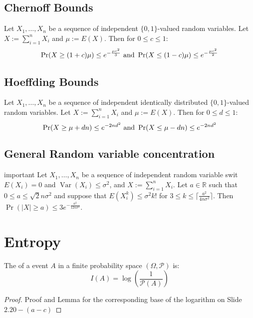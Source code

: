 \subsection{Chernoff Bounds}
Let $X_1,\ldots,X_n$ be a sequence of independent $\{0,1\}$-valued random variables. Let $X := \sum^n_{i=1}X_i$ and $\mu := E(X)$. Then for $0 \leq c \leq 1$:
\begin{equation*}
\operatorname{Pr}(X \geq (1+c)\mu)\leq e^{-\frac{\mu c^2}{3}}\\
\text{ and } \operatorname{Pr}(X \leq (1-c)\mu)\leq e^{-\frac{\mu c^2}{2}}
\end{equation*}
\subsection{Hoeffding Bounds}
Let $X_1,\ldots,X_n$ be a sequence of independent identically distributed $\{0,1\}$-valued random variables. Let $X := \sum^n_{i=1}X_i$ and $\mu := E(X)$. Then for $0 \leq d \leq 1$:
\begin{equation*}
\operatorname{Pr}(X \geq \mu +dn)\leq e^{-2nd^2}\\
\text{ and } \operatorname{Pr}(X \leq \mu -dn)\leq e^{-2nd^2}
\end{equation*}
\subsection{General Random variable concentration}

\begin{theorem}{important}
Let $X_1,\ldots,X_n$ be a sequence of independent random variable swit $E(X_i) = 0$ and $\operatorname{Var}(X_i) \leq \sigma^2$, and $X:= \sum^{n}_{i=1}X_i$. Let $a \in \mathbb{R}$ such that $0\leq a\leq \sqrt{2}n\sigma^2$ and suppose that $E(X_i^k) \leq \sigma^2k!$ for $3 \leq k \leq \lceil\frac{a^2}{4n\sigma^2}\rceil$. Then $\operatorname{Pr}(|X| \geq a) \leq 3e^{-\frac{a^2}{12n\sigma^2}}$.
\end{theorem}
\section{Entropy}
The  of a event $A$ in a finite probability space $(\Omega,\mathcal{P})$ is:
\begin{equation*}
I(A) = \operatorname{log}(\frac{1}{\mathcal{P}(A)})
\end{equation*}

\begin{proof}
	Proof and Lemma for the corresponding base of the logarithm on Slide $2.20-(a-c)$
\end{proof}

